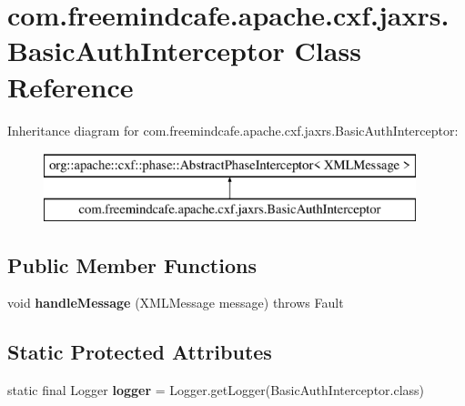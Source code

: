 \hypertarget{classcom_1_1freemindcafe_1_1apache_1_1cxf_1_1jaxrs_1_1_basic_auth_interceptor}{}\section{com.\+freemindcafe.\+apache.\+cxf.\+jaxrs.\+Basic\+Auth\+Interceptor Class Reference}
\label{classcom_1_1freemindcafe_1_1apache_1_1cxf_1_1jaxrs_1_1_basic_auth_interceptor}
Inheritance diagram for com.\+freemindcafe.\+apache.\+cxf.\+jaxrs.\+Basic\+Auth\+Interceptor\+:\begin{figure}[H]
\begin{center}
\leavevmode
\includegraphics[height=2.000000cm]{classcom_1_1freemindcafe_1_1apache_1_1cxf_1_1jaxrs_1_1_basic_auth_interceptor}
\end{center}
\end{figure}
\subsection*{Public Member Functions}
\begin{DoxyCompactItemize}
\item 
\hypertarget{classcom_1_1freemindcafe_1_1apache_1_1cxf_1_1jaxrs_1_1_basic_auth_interceptor_abe5a5adec4a8fc24bdab53ee780b43e0}{}void {\bfseries handle\+Message} (X\+M\+L\+Message message)  throws Fault \label{classcom_1_1freemindcafe_1_1apache_1_1cxf_1_1jaxrs_1_1_basic_auth_interceptor_abe5a5adec4a8fc24bdab53ee780b43e0}

\end{DoxyCompactItemize}
\subsection*{Static Protected Attributes}
\begin{DoxyCompactItemize}
\item 
\hypertarget{classcom_1_1freemindcafe_1_1apache_1_1cxf_1_1jaxrs_1_1_basic_auth_interceptor_a73c3af2206fe3cf9519313d54ae9d447}{}static final Logger {\bfseries logger} = Logger.\+get\+Logger(Basic\+Auth\+Interceptor.\+class)\label{classcom_1_1freemindcafe_1_1apache_1_1cxf_1_1jaxrs_1_1_basic_auth_interceptor_a73c3af2206fe3cf9519313d54ae9d447}

\end{DoxyCompactItemize}


